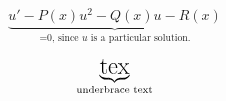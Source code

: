 \documentclass{article}
\begin{document}
\[
\underbrace{u'-P(x)u^2-Q(x)u-R(x)}_{\text{=0, since~$u$ is a particular solution.}}
\]

\begin{equation*}
    \underbrace{\text{\LARGE tex}}_{\text{underbrace text}}
\end{equation*}
\end{document}
